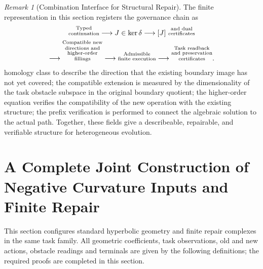 \documentclass[12pt,a4paper,openany,notitlepage]{report}
\theoremstyle{plain}
\theoremstyle{definition}
\theoremstyle{remark}
\newtheorem{remark}[theorem]{Remark}
\begin{document}
\begin{CJK*}
\begin{remark}
[Combination Interface for Structural Repair]\label{hgov:rem-interface}
The finite representation in this section registers the governance chain as \[
 \begin{gathered}
 \text{\shortstack[c]{\scriptsize Typed\\[-1pt]\scriptsize continuation}}
 \longrightarrow J\in\ker\delta
 \longrightarrow[J]\ \text{\shortstack[c]{\scriptsize and dual\\[-1pt]\scriptsize certificates}}\\
 \longrightarrow
 \text{\shortstack[c]{\scriptsize Compatible new\\[-1pt]\scriptsize directions and\\[-1pt]\scriptsize higher-order\\[-1pt]\scriptsize fillings}}
 \longrightarrow
 \text{\shortstack[c]{\scriptsize Admissible\\[-1pt]\scriptsize finite execution}}
 \longrightarrow
 \text{\shortstack[c]{\scriptsize Task readback\\[-1pt]\scriptsize and preservation\\[-1pt]\scriptsize certificates}}.
 \end{gathered}
\] homology class to describe the direction that the existing boundary image has not yet covered; the compatible extension is measured by the dimensionality of the task obstacle subspace in the original boundary quotient; the higher-order equation verifies the compatibility of the new operation with the existing structure; the prefix verification is performed to connect the algebraic solution to the actual path. Together, these fields give a describeable, repairable, and verifiable structure for heterogeneous evolution.\end{remark}


\chapter{A Complete Joint Construction of Negative Curvature Inputs and Finite Repair}
\label{exp:ch:joint}


\label{hgov:sec:joint}

This section configures standard hyperbolic geometry and finite repair complexes in the same task family. All geometric coefficients, task observations, old and new actions, obstacle readings and terminals are given by the following definitions; the required proofs are completed in this section.


\end{CJK*}
\end{document}
